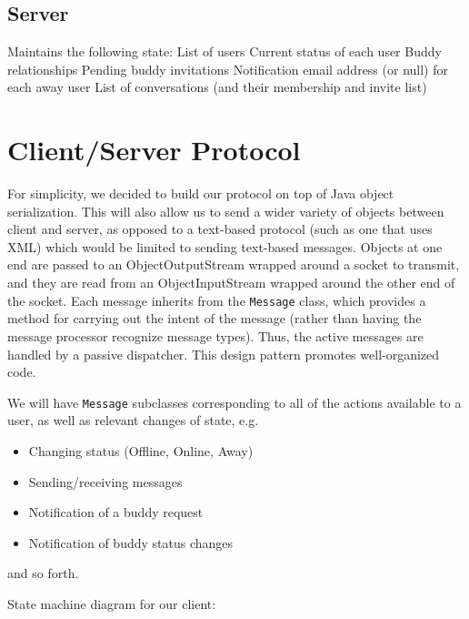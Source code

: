 \documentclass[11pt,letterpaper]{article}
\begin{document}
\subsection{Server}
Maintains the following state:\newline
List of users\newline
Current status of each user\newline
Buddy relationships\newline
Pending buddy invitations\newline
Notification email address (or null) for each away user\newline
List of conversations (and their membership and invite list)

\section{Client/Server Protocol}
For simplicity, we decided to build our protocol on top of Java object serialization.  This will also allow us to send a wider variety of objects between client and server, as opposed to a text-based protocol (such as one that uses XML) which would be limited to sending text-based messages.  Objects at one end are passed to an
ObjectOutputStream wrapped around a socket to transmit, and they are read from an ObjectInputStream wrapped around the other end of the
socket.  Each message inherits from the \texttt{Message} class, which provides a method for carrying out the intent of the message (rather
than having the message processor recognize message types).  Thus, the active messages are handled by a passive dispatcher.  This design
pattern promotes well-organized code.

We will have \texttt{Message} subclasses corresponding to all of the actions available to a user, as well as relevant changes of state, e.g.
\begin{itemize}
\item Changing status (Offline, Online, Away)
\item Sending/receiving messages
\item Notification of a buddy request
\item Notification of buddy status changes
\end{itemize}
and so forth.


State machine diagram for our client:
\begin{center}
\end{center}
\end{document}
